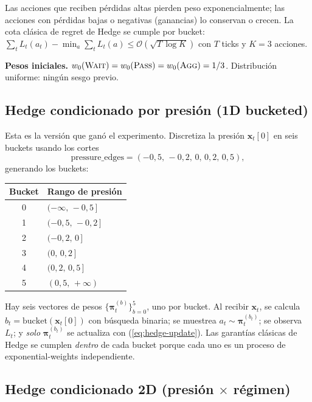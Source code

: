 \documentclass[journal,onecolumn,11pt]{IEEEtran}
\newcommand{\xv}{\mathbf{x}}
\begin{document}
Las acciones que reciben pérdidas altas pierden peso exponencialmente;
las acciones con pérdidas bajas o negativas (ganancias) lo conservan
o crecen. La cota clásica de regret de Hedge se cumple por bucket:
$\sum_t L_t(a_t) - \min_a \sum_t L_t(a) \leq \mathcal{O}(\sqrt{T\,\log K})$
con $T$ ticks y $K\!=\!3$ acciones.

\medskip

\noindent
\textbf{Pesos iniciales.} $w_0(\textsc{Wait})=w_0(\textsc{Pass})=w_0(\textsc{Agg})=1/3$.
Distribución uniforme: ningún sesgo previo.

\subsection{Hedge condicionado por presión (1D bucketed)}

Esta es la versión que ganó el experimento. Discretiza la presión
$\xv_t[0]$ en seis buckets usando los cortes
\[
\text{pressure\_edges} = (-0{,}5,\, -0{,}2,\, 0,\, 0{,}2,\, 0{,}5),
\]
generando los buckets:

\begin{center}\small
\begin{tabular}{cl}
\toprule
Bucket & Rango de presión \\
\midrule
0 & $(-\infty,\, -0{,}5\,]$ \\
1 & $(-0{,}5,\, -0{,}2\,]$ \\
2 & $(-0{,}2,\, 0\,]$ \\
3 & $(0,\, 0{,}2\,]$ \\
4 & $(0{,}2,\, 0{,}5\,]$ \\
5 & $(0{,}5,\, +\infty)$ \\
\bottomrule
\end{tabular}
\end{center}

\medskip

Hay seis vectores de pesos $\{\bm{\pi}^{(b)}_t\}_{b=0}^{5}$, uno por
bucket. Al recibir $\xv_t$, se calcula $b_t = \mathrm{bucket}(\xv_t[0])$
con búsqueda binaria; se muestrea $a_t \sim \bm{\pi}^{(b_t)}_t$; se
observa $L_t$; y \emph{solo} $\bm{\pi}^{(b_t)}_t$ se actualiza con
(\ref{eq:hedge-update}). Las garantías clásicas de Hedge se cumplen
\emph{dentro} de cada bucket porque cada uno es un proceso de
exponential-weights independiente.

\subsection{Hedge condicionado 2D (presión $\times$ régimen)}
\end{document}
